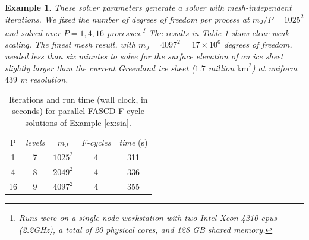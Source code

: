 \documentclass[letterpaper,final,12pt,reqno]{amsart}
\theoremstyle{cstyle}
\theoremstyle{cstyle*}
\theoremstyle{dstyle}
\newtheorem{example}[theorem]{Example}
\numberwithin{equation}{section}
\numberwithin{figure}{section}
\numberwithin{table}{section}
\numberwithin{theorem}{section}
\begin{document}
\begin{example}
These solver parameters generate a solver with mesh-independent iterations.  We fixed the number of degrees of freedom per process at $m_J/P=1025^2$ and solved over $P=1,4,16$ processes.\footnote{Runs were on a single-node workstation with two Intel Xeon 4210 cpus (2.2GHz), a total of 20 physical cores, and 128 GB shared memory.}  The results in Table \ref{tab:results:siaweak} show clear weak scaling.  The finest mesh result, with $m_J=4097^2=17 \times 10^6$ degrees of freedom, needed less than six minutes to solve for the surface elevation of an ice sheet slightly larger than the current Greenland ice sheet ($1.7$ million $\text{km}^2$) at uniform $439$ m resolution.
\end{example}

\begin{table}[ht]
\begin{tabular}{c@{\hskip 4mm}c@{\hskip 4mm}c@{\hskip 7mm}c@{\hskip 4mm}c}
P & \emph{levels} & $m_J$ & \emph{F-cycles} & \emph{time} (s) \\ \cmidrule{1-5}
 1 & 7 & $1025^2$ & 4 & 311 \\
 4 & 8 & $2049^2$ & 4 & 336 \\
16 & 9 & $4097^2$ & 4 & 355
\end{tabular}
\bigskip
\caption{Iterations and run time (wall clock, in seconds) for parallel FASCD F-cycle solutions of Example \ref{ex:sia}.}
\label{tab:results:siaweak}
\end{table}

\end{document}

